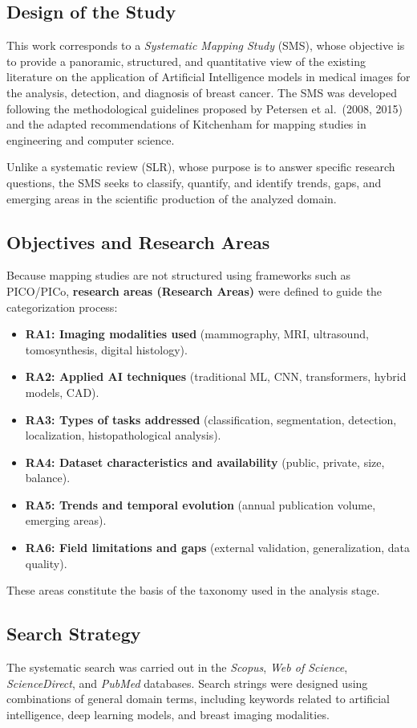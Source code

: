 \subsection{Design of the Study}
This work corresponds to a \textit{Systematic Mapping Study} (SMS), whose objective is to provide a panoramic, structured, and quantitative view of the existing literature on the application of Artificial Intelligence models in medical images for the analysis, detection, and diagnosis of breast cancer. The SMS was developed following the methodological guidelines proposed by Petersen et al.\ (2008, 2015) and the adapted recommendations of Kitchenham for mapping studies in engineering and computer science.

Unlike a systematic review (SLR), whose purpose is to answer specific research questions, the SMS seeks to classify, quantify, and identify trends, gaps, and emerging areas in the scientific production of the analyzed domain.

\subsection{Objectives and Research Areas}
Because mapping studies are not structured using frameworks such as PICO/PICo, \textbf{research areas (Research Areas)} were defined to guide the categorization process:

\begin{itemize}
    \item \textbf{RA1: Imaging modalities used} (mammography, MRI, ultrasound, tomosynthesis, digital histology).
    \item \textbf{RA2: Applied AI techniques} (traditional ML, CNN, transformers, hybrid models, CAD).
    \item \textbf{RA3: Types of tasks addressed} (classification, segmentation, detection, localization, histopathological analysis).
    \item \textbf{RA4: Dataset characteristics and availability} (public, private, size, balance).
    \item \textbf{RA5: Trends and temporal evolution} (annual publication volume, emerging areas).
    \item \textbf{RA6: Field limitations and gaps} (external validation, generalization, data quality).
\end{itemize}

These areas constitute the basis of the taxonomy used in the analysis stage.

\subsection{Search Strategy}
The systematic search was carried out in the \textit{Scopus}, \textit{Web of Science}, \textit{ScienceDirect}, and \textit{PubMed} databases. Search strings were designed using combinations of general domain terms, including keywords related to artificial intelligence, deep learning models, and breast imaging modalities.

